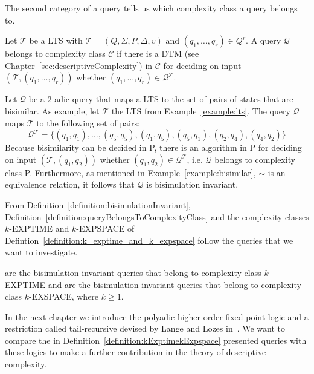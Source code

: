 The second category of a query tells us which complexity class a query belongs to.

\begin{definition}
    \label{definition:queryBelongsToComplexityClass}
    Let $\mathcal{T}$ be a LTS with $\mathcal{T} = (Q, \Sigma, P, \Delta, v)$ and $(q_1, \dots, q_{r}) \in Q^r$.
    A query $\mathcal{Q}$ belongs to complexity class $\mathcal{C}$ if there is a DTM (see
    Chapter~\ref{sec:descriptiveComplexity}) in $\mathcal{C}$ for deciding on input $(\mathcal{T}, (q_1, \dots,
    q_{r}))$ whether $(q_1, \dots, q_{r}) \in \mathcal{Q}^\mathcal{T}$.
\end{definition}

\begin{example}{\cite{lange2014capturing}}
    Let $\mathcal{Q}$ be a $2$-adic query that maps a LTS to the set of pairs of states that are bisimilar. As
    example, let $\mathcal{T}$ the LTS from Example~\ref{example:lts}. The query $\mathcal{Q}$ maps $\mathcal{T}$ to
    the following set of pairs:
    \[\mathcal{Q}^\mathcal{T} = \{(q_1, q_1), \dots, (q_5, q_5), (q_1, q_5), (q_5, q_1), (q_2, q_4), (q_4,
    q_2)\}\]
    Because bisimilarity can be decided in P, there is an algorithm in P for deciding on input $(\mathcal{T}, (q_1,
    q_2))$ whether $(q_1, q_2) \in \mathcal{Q}^\mathcal{T}$, i.e. $\mathcal{Q}$ belongs to complexity class P.
    Furthermore, as mentioned in Example~\ref{example:bisimilar}, $\sim$ is an
    equivalence relation, it follows that $\mathcal{Q}$ is bisimulation invariant.
\end{example}

From Definition~\ref{definition:bisimulationInvariant}, Definition~\ref{definition:queryBelongsToComplexityClass}
and the complexity classes $k$-EXPTIME and $k$-EXPSPACE of Defintion~\ref{definition:k_exptime_and_k_expspace} follow
the queries that we want to investigate.

\begin{definition}
    \label{definition:kExptimekExpspace}
     are the bisimulation invariant queries that belong to complexity class $k$-EXPTIME and
     are the bisimulation invariant queries that belong to complexity class $k$-EXSPACE, where $k \geq 1$.
\end{definition}

In the next chapter we introduce the polyadic higher order fixed point logic and a restriction called tail-recursive
devised by Lange and Lozes in~\cite{lange2014capturing}. We want to compare the in
Definition~\ref{definition:kExptimekExpspace} presented queries with these logics to make a further contribution in
the theory of descriptive complexity.